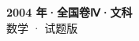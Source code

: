 \documentclass[zihao=-4, a4paper]{ctexart}
\begin{document}
\begin{center}
  {\Large\bfseries 2004 年·全国卷Ⅳ·文科}\\[4pt]
  {\large 数学 · 试题版}
\end{center}
\medskip
{}

\end{document}
